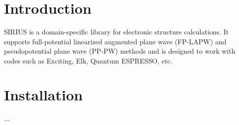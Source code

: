 \hypertarget{index_intro}{}\section{Introduction}\label{index_intro}
S\+I\+R\+I\+U\+S is a domain-\/specific library for electronic structure calculations. It supports full-\/potential linearized augmented plane wave (F\+P-\/\+L\+A\+P\+W) and pseudopotential plane wave (P\+P-\/\+P\+W) methods and is designed to work with codes such as Exciting, Elk, Quantum E\+S\+P\+R\+E\+S\+S\+O, etc. \hypertarget{index_install}{}\section{Installation}\label{index_install}
... 